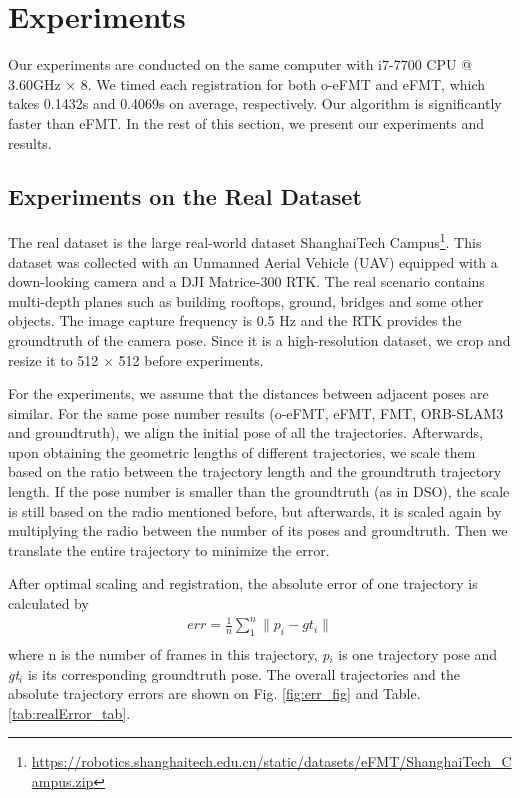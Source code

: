 \documentclass[letterpaper, 10 pt, conference]{ieeeconf}  %
\begin{document}
\section{Experiments}
Our experiments are conducted on the same computer with i7-7700 CPU @ 3.60GHz × 8. We timed each registration for both o-eFMT and eFMT, which takes 0.1432s and 0.4069s on average, respectively. Our algorithm is significantly faster than eFMT. In the rest of this section, we present 
our experiments and results.

\subsection{Experiments on the Real Dataset}
The real dataset is the large real-world dataset ShanghaiTech Campus\footnote{
\url{https://robotics.shanghaitech.edu.cn/static/datasets/eFMT/ShanghaiTech_Campus.zip}}\cite{xu2021rethinking}. This dataset was collected with an Unmanned Aerial Vehicle (UAV) equipped with a down-looking camera and a DJI Matrice-300 RTK. The real scenario contains multi-depth planes such as building rooftops, ground, bridges and some other objects. The image capture frequency is 0.5 Hz and the RTK provides the groundtruth of the camera pose. Since it is a high-resolution dataset, we crop and resize it to 512 $\times$ 512 before experiments. 

For the experiments, we assume that the distances between adjacent poses are similar. For the same pose number results (o-eFMT, eFMT, FMT, ORB-SLAM3 and groundtruth), we align the initial pose of all the trajectories. Afterwards, upon obtaining the geometric lengths of different trajectories, we scale them based on the ratio between the trajectory length and the groundtruth trajectory length. If the pose number is smaller than the groundtruth (as in DSO), the scale is still based on the radio mentioned before, but afterwards, it is scaled again by multiplying the radio between the number of its poses and groundtruth. Then we translate the entire trajectory to minimize the error. %

After optimal scaling and registration, the absolute error of one trajectory is calculated by 
\begin{equation}
    \begin{aligned}
        err = \frac{1}{n} \sum_1^{n}{\|p_i - gt_i\|} \\
    \end{aligned}
\end{equation}
where n is the number of frames in this trajectory, \textit{p$_i$} is one trajectory pose and \textit{gt$_i$} is its corresponding groundtruth pose. The overall trajectories and the absolute trajectory errors are shown on Fig. \ref{fig:err_fig} and Table. \ref{tab:realError_tab}. 
\end{document}
